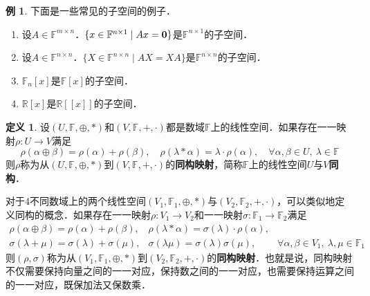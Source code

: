 \documentclass[a4paper,fontset=windows]{ctexbook}
\theoremstyle{definition}
\newtheorem{definition}{定义}[chapter]
\newtheorem{example}{例}[chapter]
\begin{document}
\begin{example}\label{ex8.4}
下面是一些常见的子空间的例子．
\begin{enumerate}
\item 设$A\in\mathbb{F}^{m\times n}$．$\{x\in\mathbb{F}^{n\times 1}\mid Ax={\bf 0}\}$是$\mathbb{F}^{n\times 1}$的子空间．

\item 设$A\in\mathbb{F}^{n\times n}$．$\{X\in\mathbb{F}^{n\times n}\mid AX=XA\}$是$\mathbb{F}^{n\times n}$的子空间．

\item $\mathbb{F}_n[x]$是$\mathbb{F}[x]$的子空间．

\item $\mathbb{R}[x]$是$\mathbb{R}[[x]]$的子空间．
\end{enumerate}
\end{example}

\begin{definition}
设$(U,\mathbb{F},\oplus,*)$和$(V,\mathbb{F},+,\cdot)$都是数域$\mathbb{F}$上的线性空间．如果存在一一映射$\rho:U\to V$满足
$$\rho(\alpha\oplus\beta)=\rho(\alpha)+\rho(\beta),\quad\rho(\lambda*\alpha)=\lambda\cdot\rho(\alpha),\quad\forall\alpha,\beta\in U,~\lambda\in\mathbb{F}$$
则$\rho$称为从$(U,\mathbb{F},\oplus,*)$到$(V,\mathbb{F},+,\cdot)$的{\bf 同构映射}，简称$\mathbb{F}$上的线性空间$U$与$V${\bf 同构}．

对于4不同数域上的两个线性空间$(V_1,\mathbb{F}_1,\oplus,*)$与$(V_2,\mathbb{F}_2,+,\cdot)$，可以类似地定义同构的概念．如果存在一一映射$\rho:V_1\to V_2$和一一映射$\sigma:\mathbb{F}_1\to\mathbb{F}_2$满足
$$\begin{array}{lll}
\rho(\alpha\oplus\beta)=\rho(\alpha)+\rho(\beta),&\rho(\lambda*\alpha)=\sigma(\lambda)\cdot\rho(\alpha), \\
\sigma(\lambda+\mu)=\sigma(\lambda)+\sigma(\mu),&\sigma(\lambda\mu)=\sigma(\lambda)\sigma(\mu),&\forall\alpha,\beta\in V_1,~\lambda,\mu\in\mathbb{F}_1
\end{array}$$
则$(\rho,\sigma)$称为从$(V_1,\mathbb{F}_1,\oplus,*)$到$(V_2,\mathbb{F}_2,+,\cdot)$的{\bf 同构映射}．也就是说，同构映射不仅需要保持向量之间的一一对应，保持数之间的一一对应，也需要保持运算之间的一一对应，既保加法又保数乘．
\end{definition}
\end{document}
